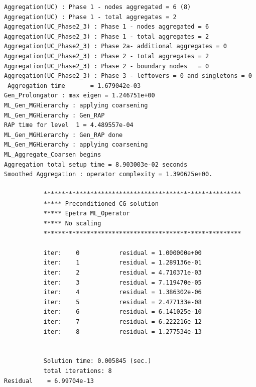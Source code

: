 \begin{verbatim}
Aggregation(UC) : Phase 1 - nodes aggregated = 6 (8)
Aggregation(UC) : Phase 1 - total aggregates = 2
Aggregation(UC_Phase2_3) : Phase 1 - nodes aggregated = 6
Aggregation(UC_Phase2_3) : Phase 1 - total aggregates = 2
Aggregation(UC_Phase2_3) : Phase 2a- additional aggregates = 0
Aggregation(UC_Phase2_3) : Phase 2 - total aggregates = 2
Aggregation(UC_Phase2_3) : Phase 2 - boundary nodes   = 0
Aggregation(UC_Phase2_3) : Phase 3 - leftovers = 0 and singletons = 0
 Aggregation time       = 1.679042e-03
Gen_Prolongator : max eigen = 1.246751e+00
ML_Gen_MGHierarchy : applying coarsening
ML_Gen_MGHierarchy : Gen_RAP
RAP time for level  1 = 4.489557e-04
ML_Gen_MGHierarchy : Gen_RAP done
ML_Gen_MGHierarchy : applying coarsening
ML_Aggregate_Coarsen begins
Aggregation total setup time = 8.903003e-02 seconds
Smoothed Aggregation : operator complexity = 1.390625e+00.

           *******************************************************
           ***** Preconditioned CG solution
           ***** Epetra ML_Operator
           ***** No scaling
           *******************************************************

           iter:    0           residual = 1.000000e+00
           iter:    1           residual = 1.289136e-01
           iter:    2           residual = 4.710371e-03
           iter:    3           residual = 7.119470e-05
           iter:    4           residual = 1.386302e-06
           iter:    5           residual = 2.477133e-08
           iter:    6           residual = 6.141025e-10
           iter:    7           residual = 6.222216e-12
           iter:    8           residual = 1.277534e-13


           Solution time: 0.005845 (sec.)
           total iterations: 8
Residual    = 6.99704e-13
\end{verbatim}
